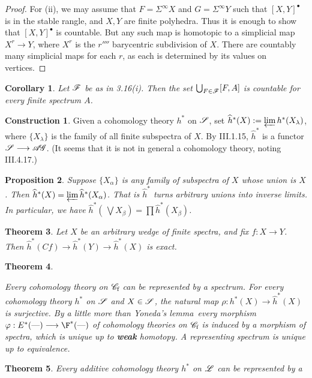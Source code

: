 \documentclass[11pt]{article}
\theoremstyle{plain}
\newtheorem{thm}{Theorem}[subsection]
\newtheorem{prop}[thm]{Proposition}
\newtheorem{cor}[thm]{Corollary}
\theoremstyle{definition}
\newtheorem*{const*}{Construction}
\newcommand{\AG}{\scrA\!\scrG}
\newcommand{\Specf}{\scrC_\textup{f}}
\begin{document}
{\begin{proof}
For (ii), we may assume that $F=\Sigma^\infty X$ and $G=\Sigma^\infty Y$ such
that $[X,Y]^\bullet$ is in the stable rangle, and $X,Y$ are finite polyhedra.
Thus it is enough to show that $[X,Y]^\bullet$ is countable. But any such map is
homotopic to a simplicial map $X^r\to Y$, where $X^r$ is the $r\fourth$
barycentric subdivision of $X$. There are countably many simplicial maps for
each $r$, as each is determined by its values on vertices.
\end{proof}
\begin{cor}
Let $\mathscr{F}$ be as in \textup{3.16(i)}. Then the set $\bigcup_{F\in\mathscr{F}}[F,A]$
is countable for every finite spectrum $A$.
\end{cor}
\begin{const*}
Given a cohomology theory $h^*$ on $\mathscr{S}$, set $\widehat h^*(X):=\varprojlim
h^*(X_\lambda)$, where $\{X_\lambda\}$ is the family of all finite subspectra of
$X$. By III.1.15, $\widehat h^*$ is a functor $\scrS\to\AG$. (It seems that it
is not in general a cohomology theory, noting III.4.17.)
\end{const*}
\begin{prop}
Suppose $\{X_\alpha\}$ is any family of subspectra of $X$ whose union is $X$.
Then $\widehat h^*(X)=\varprojlim \widehat h^*(X_\alpha)$. That is $\widehat
h^*$ turns arbitrary unions into inverse limits. In particular, we have
$\widehat h^*(\,\bigvee\! X_\beta)=\prod\widehat h^*(X_\beta)$.
\end{prop}
\begin{thm}
Let $X$ be an arbitrary wedge of finite spectra, and fix $f:X\to Y$. Then
$\widehat h^*(Cf)\to\widehat h^*(Y)\to\widehat h^*(X)$ is exact.
\end{thm}
\begin{thm}\hfil
\begin{itemise}
\itm[(i)] Every cohomology theory on $\Specf$ can be represented by a spectrum.
\itm[(ii)] For every cohomology theory $h^*$ on $\mathscr{S}$ and $X\in\mathscr{S}$,
the natural map $\rho:h^*(X)\to\widehat h^*(X)$ is surjective.
\itm[(iii)]\lparen By a little more than Yoneda's lemma\upcol\rparen\ every
morphism $\phi:E^*(\DASH)\to\F^*(\DASH)$ of cohomology theories on $\Specf$ is
induced by a morphism of spectra, which is unique up to \textbf{weak} homotopy.
A representing spectrum is unique up to equivalence.
\end{itemise}
\end{thm}
\begin{thm}
Every additive cohomology theory $h^*$ on $\mathscr{L}$ can be represented by a

\end{thm}}
\end{document}
